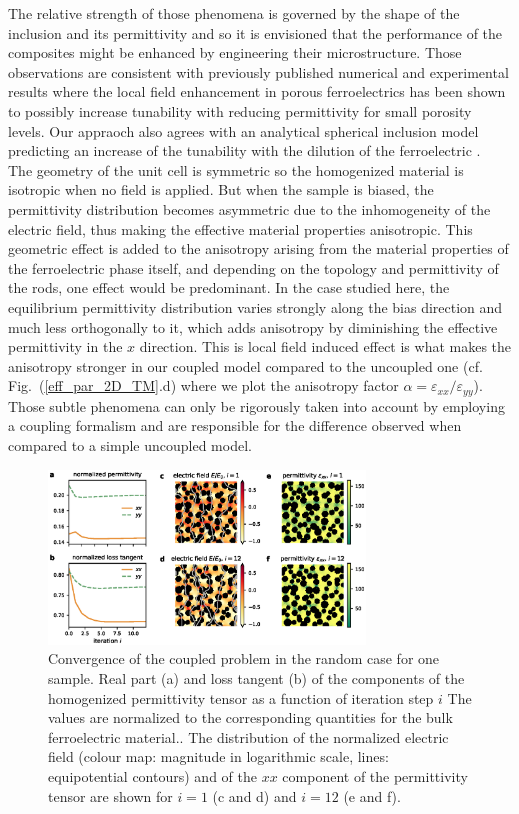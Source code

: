 \documentclass[%
 aip,
 amsmath,amssymb,
 reprint,%
]{revtex4-1}
\newcommand{\co}[1]{#1}
\begin{document}
The relative strength of those phenomena is governed by the shape of the inclusion and its permittivity
and so it is envisioned that the performance of the composites might be enhanced by engineering
their microstructure. \co{Those observations are consistent with previously published numerical and experimental results \cite{padurariu_tailoring_2012}
 where the local field enhancement in porous ferroelectrics has been shown to possibly increase tunability with reducing permittivity for small porosity levels. Our appraoch also agrees with an analytical spherical inclusion model predicting an increase of the tunability with the dilution of the ferroelectric \cite{sherman_ferroelectric-dielectric_2006}.}\\
The geometry of the unit cell is symmetric so the homogenized material is
isotropic when no field is applied.
But when the sample is biased, the permittivity distribution becomes asymmetric due
to the inhomogeneity of the electric field, thus making the effective material properties anisotropic.
This geometric effect is added to the anisotropy arising from the material properties of the ferroelectric
phase itself, and depending on the topology and permittivity of the rods, one effect would be predominant.
In the case studied here, the equilibrium permittivity distribution varies strongly along the bias
 direction and much less orthogonally to it, which adds anisotropy by diminishing the effective
 permittivity in the $x$ direction. This is local field induced effect is what makes the anisotropy stronger
 in our coupled model compared to the uncoupled one (cf. Fig.~(\ref{eff_par_2D_TM}.d) \co{where we plot the anisotropy factor \co{$\alpha =\varepsilon_{xx} / \varepsilon_{yy}$}}).
Those subtle phenomena can only be rigorously taken into account by employing a coupling formalism
and are responsible for the difference observed when compared to a simple uncoupled model.\\
\begin{figure}[!t]
 \centering
 \includegraphics[width=0.75\textwidth]{convergence_rand}
 \caption{Convergence of the coupled problem in the random case
  for one sample.
  Real part (a) and loss tangent (b) of the components of the homogenized
  permittivity tensor as a function of iteration step $i$ \co{The values are normalized to the corresponding quantities for the bulk ferroelectric material.}. The distribution of
  the normalized electric field (colour map: magnitude in logarithmic scale,
  lines: equipotential contours) and of the $xx$ component of the permittivity tensor are shown for $i=1$
  (c and d) and $i=12$ (e and f).
 }
 \label{conv_random}
\end{figure}
\end{document}
